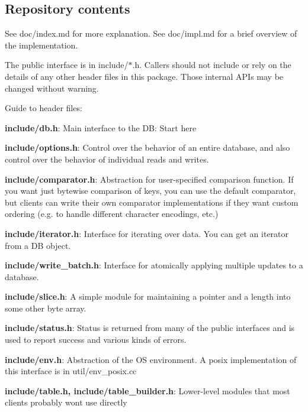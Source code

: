 \subsection*{Repository contents}

See doc/index.md for more explanation. See doc/impl.md for a brief overview of the implementation.

The public interface is in include/$\ast$.h. Callers should not include or rely on the details of any other header files in this package. Those internal A\+P\+Is may be changed without warning.

Guide to header files\+:


\begin{DoxyItemize}
\item {\bfseries{include/db.\+h}}\+: Main interface to the DB\+: Start here
\item {\bfseries{include/options.\+h}}\+: Control over the behavior of an entire database, and also control over the behavior of individual reads and writes.
\item {\bfseries{include/comparator.\+h}}\+: Abstraction for user-\/specified comparison function. If you want just bytewise comparison of keys, you can use the default comparator, but clients can write their own comparator implementations if they want custom ordering (e.\+g. to handle different character encodings, etc.)
\item {\bfseries{include/iterator.\+h}}\+: Interface for iterating over data. You can get an iterator from a DB object.
\item {\bfseries{include/write\+\_\+batch.\+h}}\+: Interface for atomically applying multiple updates to a database.
\item {\bfseries{include/slice.\+h}}\+: A simple module for maintaining a pointer and a length into some other byte array.
\item {\bfseries{include/status.\+h}}\+: Status is returned from many of the public interfaces and is used to report success and various kinds of errors.
\item {\bfseries{include/env.\+h}}\+: Abstraction of the OS environment. A posix implementation of this interface is in util/env\+\_\+posix.\+cc
\item {\bfseries{include/table.\+h, include/table\+\_\+builder.\+h}}\+: Lower-\/level modules that most clients probably won\textquotesingle{}t use directly 
\end{DoxyItemize}